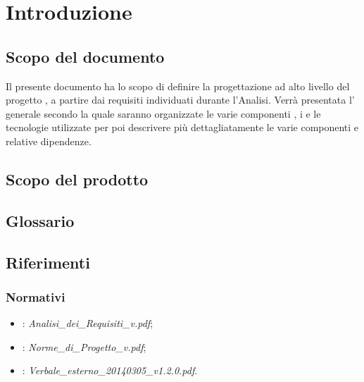 \newpage
\tableofcontents

\newpage
\listoffigures %

\newpage
\section{Introduzione}
\subsection{Scopo del documento}
Il presente documento ha lo scopo di definire la progettazione ad alto livello del progetto \textbf{}, a partire dai requisiti individuati durante l'Analisi. Verrà presentata l' generale secondo la quale saranno organizzate le varie componenti , i  e le tecnologie utilizzate per poi descrivere più dettagliatamente le varie componenti e relative dipendenze.

\subsection{Scopo del prodotto}
\Prodotto{}

\subsection{Glossario}
\Glossario{}

\subsection{Riferimenti}

\subsubsection{Normativi}
\begin{itemize}
\item {}: \emph{Analisi\_{}dei\_{}Requisiti\_{}v\versioneAnalisiDeiRequisiti{}.pdf};
\item {}: \emph{Norme\_{}di\_{}Progetto\_{}v\versioneNormeDiProgetto{}.pdf};
\item {}: \emph{Verbale\_esterno\_20140305\_v1.2.0.pdf}.
\end{itemize}


